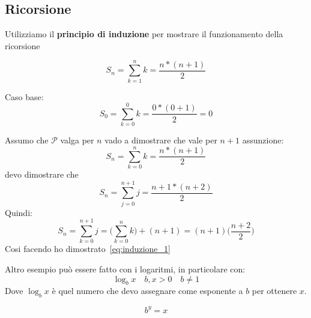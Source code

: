 \documentclass[../main.tex]{subfiles}
\begin{document}
\subsection{Ricorsione}\label{sec:ricorsione}
Utilizziamo il \textbf{principio di induzione} per mostrare il funzionamento della ricorsione

\begin{exmp}
\begin{equation*}
        S_n = \sum_{k=1}^{n} k = \frac{n * (n+1)}{2}
\end{equation*}

Caso base:
\begin{equation*}
        S_0 = \sum_{k=0}^{0} k = \frac{0 * (0+1)}{2} = 0
\end{equation*}
\end{exmp}

Assumo che $ \mathcal{P} $ valga per $ n $ vado a dimostrare che vale per $n+1$ assunzione:
\begin{equation*}
        S_n = \sum_{k=0}^{n} k = \frac{n * (n+1)}{2}
\end{equation*}
devo dimostrare che 
\begin{equation}\label{eq:induzione_1}
        S_n = \sum_{j=0}^{n+1} j = \frac{n+1 * (n+2)}{2}
\end{equation}
Quindi:        
\begin{equation*}
        S_n = \sum_{k=0}^{n+1} j = \Bigg(\sum_{k=0}^{n} k\Bigg)+ (n+1) = (n+1)\Big(\frac{n+2}{2}\Big)
\end{equation*}
Cosi facendo ho dimostrato~\ref{eq:induzione_1}


\newpage

Altro esempio può essere fatto con i logaritmi, in particolare con:
\begin{equation*}
       \boxed{\log_b x \quad b,x > 0 \quad b \not=1}
\end{equation*}
Dove $ \log_b x $ è quel numero che devo assegnare come esponente a $b$ per ottenere $x$.

\begin{equation*}
        b^y = x
\end{equation*}

 
\end{document}
